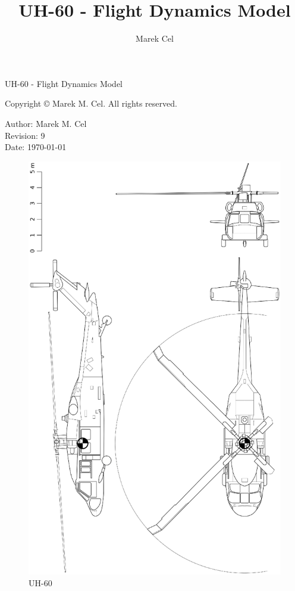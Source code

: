 \documentclass[12pt,a4paper]{article}
\title{UH-60 - Flight Dynamics Model}
\author{Marek Cel}
\date{}
\begin{document}
  
  \begin{titlepage}
    \centering
    {\huge UH-60 - Flight Dynamics Model\par}
  \end{titlepage}
  

  \noindent Copyright \copyright{} \the\year{} Marek M. Cel. All rights reserved.

  \noindent Author: Marek M. Cel \\
  Revision: 9 \\
  Date: \today

  
  
  \clearpage
  
  \begin{figure}[p]
    \centering
    \includegraphics[width=160mm]{eps/uh60_3view.eps}
    \caption{UH-60}
  \end{figure}
\end{document}
